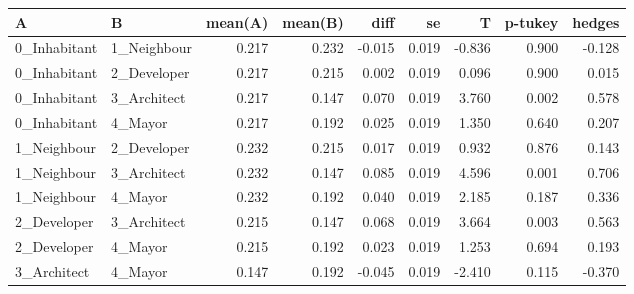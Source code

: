 \begin{tabular}{llrrrrrrr}
\toprule
            A &            B &  mean(A) &  mean(B) &   diff &     se &      T &  p-tukey &  hedges \\
\midrule
 0\_Inhabitant &  1\_Neighbour &    0.217 &    0.232 & -0.015 &  0.019 & -0.836 &    0.900 &  -0.128 \\
 0\_Inhabitant &  2\_Developer &    0.217 &    0.215 &  0.002 &  0.019 &  0.096 &    0.900 &   0.015 \\
 0\_Inhabitant &  3\_Architect &    0.217 &    0.147 &  0.070 &  0.019 &  3.760 &    0.002 &   0.578 \\
 0\_Inhabitant &      4\_Mayor &    0.217 &    0.192 &  0.025 &  0.019 &  1.350 &    0.640 &   0.207 \\
  1\_Neighbour &  2\_Developer &    0.232 &    0.215 &  0.017 &  0.019 &  0.932 &    0.876 &   0.143 \\
  1\_Neighbour &  3\_Architect &    0.232 &    0.147 &  0.085 &  0.019 &  4.596 &    0.001 &   0.706 \\
  1\_Neighbour &      4\_Mayor &    0.232 &    0.192 &  0.040 &  0.019 &  2.185 &    0.187 &   0.336 \\
  2\_Developer &  3\_Architect &    0.215 &    0.147 &  0.068 &  0.019 &  3.664 &    0.003 &   0.563 \\
  2\_Developer &      4\_Mayor &    0.215 &    0.192 &  0.023 &  0.019 &  1.253 &    0.694 &   0.193 \\
  3\_Architect &      4\_Mayor &    0.147 &    0.192 & -0.045 &  0.019 & -2.410 &    0.115 &  -0.370 \\
\bottomrule
\end{tabular}
